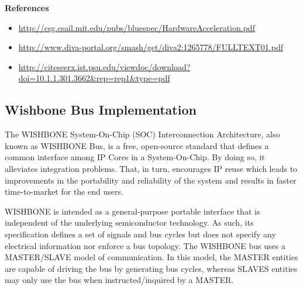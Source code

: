 \documentclass[a4paper,12pt,twoside]{article}
\begin{document}
\textbf{References}
\begin{itemize}
    \item \url{http://csg.csail.mit.edu/pubs/bluespec/HardwareAcceleration.pdf}
    \item \url{http://www.diva-portal.org/smash/get/diva2:1265778/FULLTEXT01.pdf}
    \item \url{http://citeseerx.ist.psu.edu/viewdoc/download?doi=10.1.1.301.3662&rep=rep1&type=pdf}

\end{itemize}

\subsection{Wishbone Bus Implementation}
The WISHBONE System-On-Chip (SOC) Interconnection Architecture, also known as WISHBONE Bus, is a free, open-source standard that defines a common interface among IP Cores in a System-On-Chip. By doing so, it alleviates integration problems. That, in turn, encourages IP reuse which leads to improvements in the portability and reliability of the system and results in faster time-to-market for the end users.

WISHBONE is intended as a general-purpose portable interface that is independent of the underlying semiconductor technology. As such, its specification defines a set of signals and bus cycles but does not specify any electrical information nor enforce a bus topology. The WISHBONE bus uses a MASTER/SLAVE model of communication. In this model, the MASTER entities are capable of driving the bus by generating bus cycles, whereas SLAVES entities may only use the bus when instructed/inquired by a MASTER.
\end{document}
